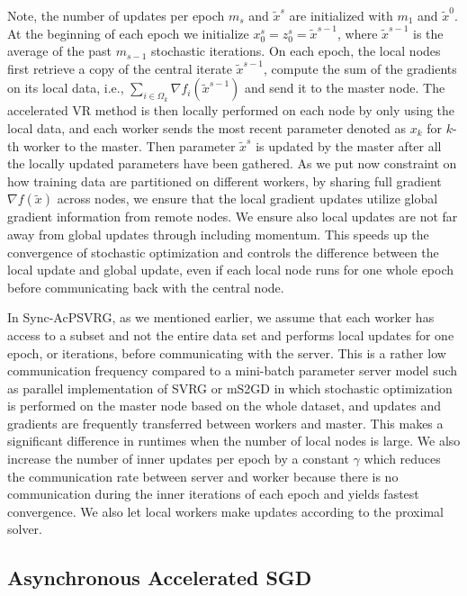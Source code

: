 \documentclass[letterpaper]{article} %
\begin{document}
{Note, the number of updates per epoch $m_s$ and $\widetilde{x}^s$ are initialized with $m_1$ and $\widetilde{x}^0$. At the beginning of each epoch we initialize $x_0^s=z_0^s=\widetilde{x}^{s-1}$, where $\widetilde{x}^{s-1}$ is the average of the past $m_{s-1}$ stochastic iterations.} On  each  epoch,  the  local  nodes  first  retrieve  a  copy of  the  central  iterate $\widetilde{x}^{s-1}$, compute the sum of the gradients on its local data, i.e., $\sum_{i\in\Omega_k}{\nabla f_i{(\widetilde{x}^{s-1})}}$ and send it to the master node. The accelerated VR method is then locally performed on each node by only using the local data, and each worker sends the most recent parameter denoted as ${x}_k$ for $k$-th worker to the master. Then parameter $\widetilde{x}^s$ is updated by the master after all the locally updated parameters have been gathered. As we put now constraint on how training data are partitioned on different workers, by sharing full gradient $\nabla f(\widetilde{x})$ across nodes, we ensure  that  the  local  gradient  updates  utilize  global  gradient information from remote nodes. We ensure also local updates are not far away from global updates through including momentum. This speeds up the convergence of stochastic optimization and controls the difference between the local update and global update, even if each local  node  runs  for  one  whole  epoch  before  communicating back with the central node. 

In Sync-AcPSVRG, as we mentioned earlier, we assume that each worker has access to a subset and not the entire data set and performs local updates for one epoch, or iterations, before communicating with
the  server. This  is  a  rather  low  communication  frequency
compared  to  a mini-batch parameter  server  model such as parallel implementation of SVRG \cite{Zhao2014} or mS2GD \cite{Konecny2016} in which stochastic optimization is performed on the master node based on the whole dataset, and updates and gradients are frequently transferred between workers and master. This  makes  a  significant  difference  in  runtimes  when  the
number of local nodes is large.
 We also increase the number of inner updates per epoch by a constant $\gamma$ which reduces the communication rate between server and worker because there is no communication during the inner iterations of each epoch and yields fastest convergence. We also let local workers make updates according to the proximal solver.

\subsection{Asynchronous Accelerated SGD}
\end{document}
